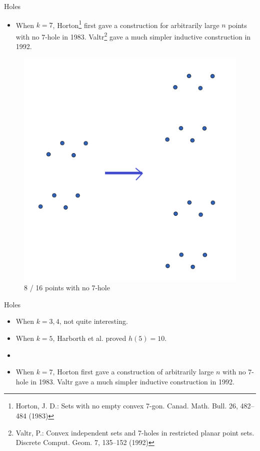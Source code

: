 \documentclass{beamer}
\begin{document}
\begin{frame}{Holes}
    
\begin{itemize}


\item 
When $k=7$, Horton\footnote{Horton, J. D.: Sets with no empty convex 7-gon. Canad. Math. Bull. 26, 482–484 (1983)} first gave a construction for  arbitrarily large $n$ points with no $7$-hole in 1983. Valtr\footnote{Valtr, P.: Convex independent sets and 7-holes in restricted planar point sets. Discrete Comput.
Geom. 7, 135–152 (1992)} gave a much simpler inductive construction  in 1992. 
\end{itemize}

\begin{figure}
\centering
        \includegraphics[width=0.5\linewidth]{7hole1.png}
        \caption{8 / 16 points with no 7-hole}

\label{figh7}
\end{figure}

\end{frame}



\begin{frame}{Holes}
    
\begin{itemize}
\item 
When $k=3,4$, not quite interesting.
\item 
When $k=5$, Harborth et al. proved $h(5)=10$.
\item 

\item 
When $k=7$, Horton first gave a construction of arbitrarily large $n$ with no $7$-hole in 1983. Valtr gave a much simpler inductive construction  in 1992. 
\end{itemize}
\end{frame}
\end{document}
